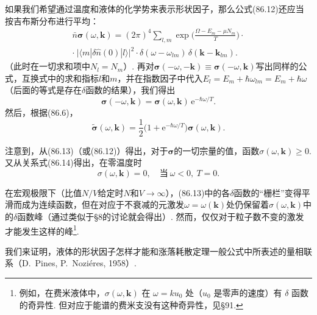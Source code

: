 如果我们希望通过温度和液体的化学势来表示形状因子，那么公式(86.12)还应当按吉布斯分布进行平均：
\begin{equation}
\begin{split}
\bar{n}\bm{\sigma}(\omega,\bm{k})=(2\pi)^{4}\sum_{l,m}\exp\biggl(\frac{\varOmega-E_{m}-\mu N_{m}}{T}\biggr)\cdot{}\\
\cdot\ \bigl|\langle m|\delta\hat{n}(0)|l\rangle\bigr|^{2}\cdot\delta(\omega-\omega_{lm})\,\delta(\bm{k}-\bm{k}_{lm}).
\end{split}
\end{equation}
（此时在一切求和项中$N_{l}=N_{m}$）. 再对$\bm{\sigma}(-\omega,-\bm{k})\equiv\bm{\sigma}(-\omega,\bm{k})$写出同样的公式，互换式中的求和指标$l$和$m$，并在指数因子中代入$E_{l}=E_{m}+\hbar\omega_{lm}=E_{m}+\hbar\omega$（后面的等式是存在$\delta$函数的结果），我们得出
\begin{equation}
\bm{\sigma}(-\omega,\bm{k})=\bm{\sigma}(\omega,\bm{k})\,\mathrm{e}^{-\hbar\omega/T}.
\end{equation}
然后，根据(86.6)，
\begin{equation}
\tilde{\bm{\sigma}}(\omega,\bm{k})=\frac{1}{2}\bigl(1+\mathrm{e}^{-\hbar\omega/T}\bigr)\bm{\sigma}(\omega,\bm{k}).
\end{equation}

注意到，从(86.13)（或(86.12)）得出，对于$\bm{\sigma}$的一切宗量的值，函数$\sigma(\omega,\bm{k})\geqslant0$. 又从关系式(86.14)得出，在零温度时
\begin{equation}
\sigma(\omega,\bm{k})=0,\quad\text{当}\ \omega<0,\ T=0.
\end{equation}

在宏观极限下（比值$N/V$给定时$N$和$V\to\infty$），(86.13)中的各$\delta$函数的“栅栏”变得平滑而成为连续函数，但在对应于不衰减的元激发$\omega=\omega(\bm{k})$处仍保留着$\sigma(\omega,\bm{k})$中的$\delta$函数峰（通过类似于§8的讨论就会得出）. 然而，仅仅对于粒子数不变的激发才能发生这样的峰\footnote{例如，在费米液体中，$\sigma(\omega,\bm{k})$ 在 $\omega=ku_{0}$ 处（$u_{0}$ 是零声的速度）有 $\delta$ 函数的奇异性. 但对应于能谱的费米支没有这种奇异性，见§91.}.

我们来证明，液体的形状因子怎样才能和涨落耗散定理一般公式中所表述的量相联系（D.~Pines, P.~Nozi\'eres, 1958）.

